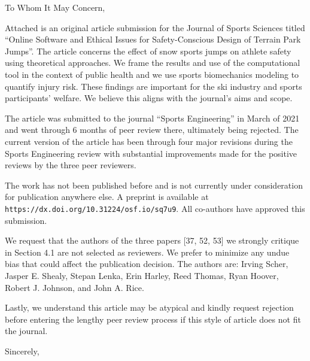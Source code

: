 \documentclass[en]{tuletter}
\date{October 5, 2021}
\begin{document}
\makeheader
\opening{To Whom It May Concern,}

Attached is an original article submission for the Journal of Sports Sciences
titled ``Online Software and Ethical Issues for Safety-Conscious Design of
Terrain Park Jumps''. The article concerns the effect of snow sports jumps on
athlete safety using theoretical approaches. We frame the results and use of
the computational tool in the context of public health and we use sports
biomechanics modeling to quantify injury risk. These findings are important for
the ski industry and sports participants' welfare. We believe this aligns with
the journal's aims and scope.

The article was submitted to the journal ``Sports Engineering'' in March of
2021 and went through 6 months of peer review there, ultimately being rejected.
The current version of the article has been through four major revisions during
the Sports Engineering review with substantial improvements made for the
positive reviews by the three peer reviewers.

The work has not been published before and is not currently under consideration
for publication anywhere else. A preprint is available at
\verb|https://dx.doi.org/10.31224/osf.io/sq7u9|. All co-authors have approved
this submission.

We request that the authors of the three papers [37, 52, 53] we strongly
critique in Section 4.1 are not selected as reviewers. We prefer to minimize
any undue bias that could affect the publication decision. The authors are:
Irving Scher, Jasper E. Shealy, Stepan Lenka, Erin Harley, Reed Thomas, Ryan
Hoover, Robert J. Johnson, and John A. Rice.

Lastly, we understand this article may be atypical and kindly request rejection
before entering the lengthy peer review process if this style of article does
not fit the journal.

\closing{Sincerely,}
\end{document}
